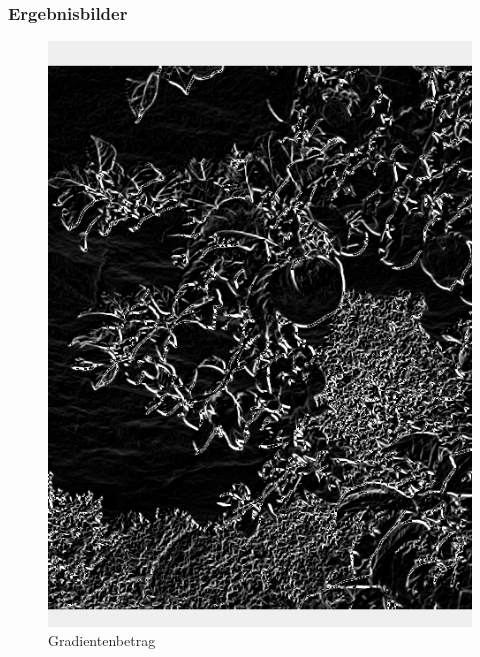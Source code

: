 \documentclass[12pt]{article}
\begin{document}
\subsubsection*{Ergebnisbilder}
\begin{figure}[H]
  \centering
  \begin{minipage}{0.49\textwidth}
    \centering
    \includegraphics[width=\textwidth, height=0.4\textheight, keepaspectratio]{value.png}
    Gradientenbetrag
  \end{minipage}
  \begin{minipage}{0.49\textwidth}
    \centering

\end{minipage}
\end{figure}
\end{document}
